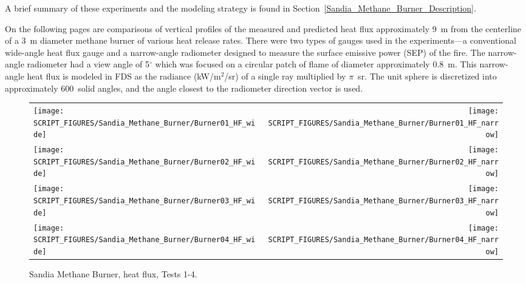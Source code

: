 A brief summary of these experiments and the modeling strategy is found in Section~\ref{Sandia_Methane_Burner_Description}. 

On the following pages are comparisons of vertical profiles of the measured and predicted heat flux approximately 9~m from the centerline of a 3~m diameter methane burner of various heat release rates. There were two types of gauges used in the experiments---a conventional wide-angle heat flux gauge and a narrow-angle radiometer designed to measure the surface emissive power (SEP) of the fire. The narrow-angle radiometer had a view angle of 5$^\circ$ which was focused on a circular patch of flame of diameter approximately 0.8~m. This narrow-angle heat flux is modeled in FDS as the radiance (kW/m$^2$/sr) of a single ray multiplied by $\pi$~sr. The unit sphere is discretized into approximately 600~solid angles, and the angle closest to the radiometer direction vector is used.

\newpage

\begin{figure}[p]
\begin{tabular*}{\textwidth}{l@{\extracolsep{\fill}}r}
\texttt{[image: SCRIPT\_FIGURES/Sandia\_Methane\_Burner/Burner01\_HF\_wide]} &
\texttt{[image: SCRIPT\_FIGURES/Sandia\_Methane\_Burner/Burner01\_HF\_narrow]} \\
\texttt{[image: SCRIPT\_FIGURES/Sandia\_Methane\_Burner/Burner02\_HF\_wide]} &
\texttt{[image: SCRIPT\_FIGURES/Sandia\_Methane\_Burner/Burner02\_HF\_narrow]} \\
\texttt{[image: SCRIPT\_FIGURES/Sandia\_Methane\_Burner/Burner03\_HF\_wide]} &
\texttt{[image: SCRIPT\_FIGURES/Sandia\_Methane\_Burner/Burner03\_HF\_narrow]} \\
\texttt{[image: SCRIPT\_FIGURES/Sandia\_Methane\_Burner/Burner04\_HF\_wide]} &
\texttt{[image: SCRIPT\_FIGURES/Sandia\_Methane\_Burner/Burner04\_HF\_narrow]}
\end{tabular*}
\caption[Sandia Methane Burner, heat flux, Tests 1-4] {Sandia Methane Burner, heat flux, Tests 1-4.}
\label{Sandia_Methane_Burner_HF_1}
\end{figure}

